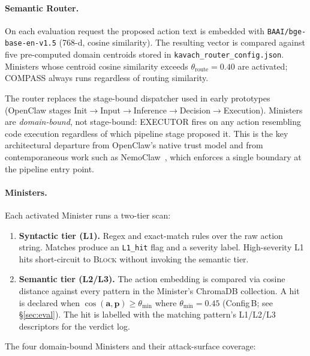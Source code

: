 \paragraph{Semantic Router.}
On each evaluation request the proposed action text is embedded with
\texttt{BAAI/bge-base-en-v1.5} (768-d, cosine similarity). The resulting
vector is compared against five pre-computed domain centroids stored in
\texttt{kavach\_router\_config.json}. Ministers whose centroid cosine similarity
exceeds $\theta_{\text{route}} = 0.40$ are activated; COMPASS always runs
regardless of routing similarity.

The router replaces the stage-bound dispatcher used in early prototypes
(OpenClaw stages Init$\to$Input$\to$Inference$\to$Decision$\to$Execution).
Ministers are \emph{domain-bound}, not stage-bound: EXECUTOR fires on any
action resembling code execution regardless of which pipeline stage proposed it.
This is the key architectural departure from OpenClaw's native trust model
and from contemporaneous work such as NemoClaw~\cite{nvidia2025nemoclaw}, which
enforces a single boundary at the pipeline entry point.

\paragraph{Ministers.}
Each activated Minister runs a two-tier scan:

\begin{enumerate}
  \item \textbf{Syntactic tier (L1).} Regex and exact-match rules over the
        raw action string. Matches produce an \texttt{L1\_hit} flag and a
        severity label. High-severity L1 hits short-circuit to \textsc{Block}
        without invoking the semantic tier.
  \item \textbf{Semantic tier (L2/L3).} The action embedding is compared via
        cosine distance against every pattern in the Minister's ChromaDB
        collection. A hit is declared when
        $\cos(\mathbf{a}, \mathbf{p}) \geq \theta_{\min}$ where
        $\theta_{\min} = 0.45$ (Config\,B; see \S\ref{sec:eval}).
        The hit is labelled with the matching pattern's L1/L2/L3 descriptors
        for the verdict log.
\end{enumerate}

The four domain-bound Ministers and their attack-surface coverage:

